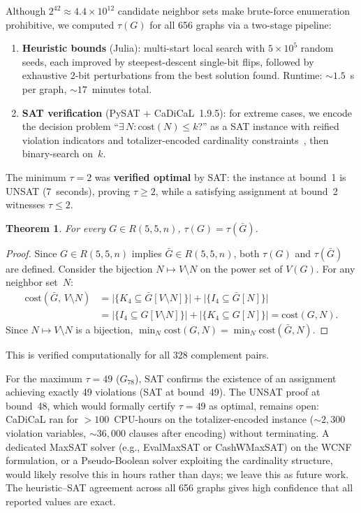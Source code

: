 \documentclass[11pt,a4paper]{article}
\newtheorem{theorem}{Theorem}
\theoremstyle{definition}
\theoremstyle{remark}
\newcommand{\Rset}[3]{R(#1,#2,#3)}
\begin{document}
Although $2^{42} \approx 4.4 \times 10^{12}$ candidate neighbor
sets make brute-force enumeration prohibitive, we computed
$\tau(G)$ for all 656 graphs via a two-stage pipeline:
\begin{enumerate}
  \item \textbf{Heuristic bounds} (Julia): multi-start local search
    with $5 \times 10^5$ random seeds, each improved by
    steepest-descent single-bit flips, followed by exhaustive
    2-bit perturbations from the best solution found.
    Runtime: $\sim\!1.5$~s per graph, $\sim\!17$~minutes total.
  \item \textbf{SAT verification} (PySAT + CaDiCaL~1.9.5):
    for extreme cases, we encode the decision problem
    ``$\exists\, N : \text{cost}(N) \leq k$?'' as a SAT instance
    with reified violation indicators and totalizer-encoded
    cardinality constraints~\cite{PySAT}, then binary-search on~$k$.
\end{enumerate}

The minimum $\tau = 2$ was \textbf{verified optimal} by SAT:
the instance at bound~1 is UNSAT (7~seconds), proving $\tau \geq 2$,
while a satisfying assignment at bound~2 witnesses $\tau \leq 2$.

\begin{theorem}\label{thm:tau-complement}
For every $G \in \Rset{5}{5}{n}$, $\tau(G) = \tau(\bar{G})$.
\end{theorem}

\begin{proof}
Since $G \in \Rset{5}{5}{n}$ implies $\bar{G} \in \Rset{5}{5}{n}$,
both $\tau(G)$ and $\tau(\bar{G})$ are defined.
Consider the bijection $N \mapsto V \setminus N$ on the power set
of $V(G)$.  For any neighbor set~$N$:
\begin{align*}
  \mathrm{cost}(\bar{G},\, V \setminus N)
    &= \bigl|\{K_4 \subseteq \bar{G}[V \setminus N]\}\bigr|
     + \bigl|\{I_4 \subseteq \bar{G}[N]\}\bigr| \\
    &= \bigl|\{I_4 \subseteq G[V \setminus N]\}\bigr|
     + \bigl|\{K_4 \subseteq G[N]\}\bigr|
     = \mathrm{cost}(G, N).
\end{align*}
Since $N \mapsto V \setminus N$ is a bijection,
$\min_N \mathrm{cost}(G, N) = \min_N \mathrm{cost}(\bar{G}, N)$.
\end{proof}

This is verified computationally for all 328 complement pairs.

For the maximum $\tau = 49$ ($G_{78}$), SAT confirms the existence of
an assignment achieving exactly 49 violations (SAT at bound~49).
The UNSAT proof at bound~48, which would formally certify
$\tau = 49$ as optimal, remains open: CaDiCaL ran for
$> 100$~CPU-hours on the totalizer-encoded instance
($\sim\!2{,}300$ violation variables, $\sim\!36{,}000$ clauses
after encoding) without terminating.
A dedicated MaxSAT solver (e.g., EvalMaxSAT or CashWMaxSAT)
on the WCNF formulation, or a Pseudo-Boolean solver exploiting
the cardinality structure, would likely resolve this in hours
rather than days; we leave this as future work.
The heuristic--SAT agreement across all 656 graphs gives
high confidence that all reported values are exact.
\end{document}
